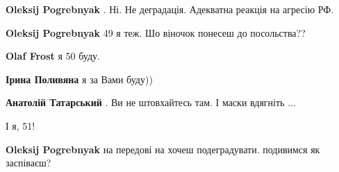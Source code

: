 \begin{itemize}
\begin{itemize}
\textbf{Oleksij Pogrebnyak} . Ні. Не деградація. Адекватна реакція на агресію РФ.

 
\textbf{Oleksij Pogrebnyak} 49 я теж. Шо віночок понесеш до посольства??

\begin{itemize}
 
\textbf{Olaf Frost} я 50 буду.

 
\textbf{Ірина Поливяна} я за Вами буду))

 
\textbf{Анатолій Татарський} . Ви не штовхайтесь там. І маски вдягніть
...

 
І я, 51!
\end{itemize}

\end{itemize}

 
\textbf{Oleksij Pogrebnyak} на передові на хочеш подеградувати. подивимся як заспіваєш?


\end{itemize}
